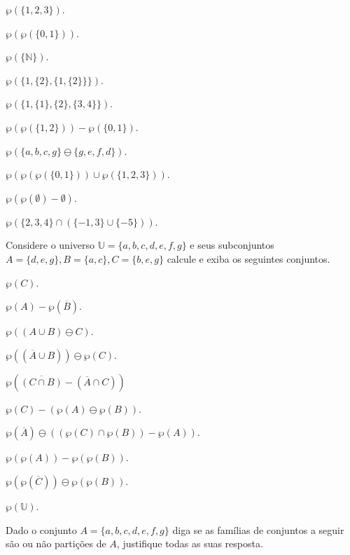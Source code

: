\begin{exerList}
	\item $\wp(\{1, 2, 3\})$.
	\item $\wp(\wp(\{0,1\}))$.
	\item $\wp(\{\mathbb{N}\})$.
	\item $\wp(\{1, \{2\}, \{1, \{2\}\}\})$.
	\item $\wp(\{1, \{1\}, \{2\}, \{3, 4\}\})$.
	\item $\wp(\wp(\{1, 2\})) - \wp(\{0, 1\})$.
	\item $\wp(\{a, b, c, g\} \ominus \{g, e, f, d\})$.
	\item $\wp(\wp(\wp(\{0,1\})) \cup \wp(\{1, 2, 3\}))$.
	\item $\wp(\wp(\emptyset) - \emptyset)$.
	\item $\wp(\{2, 3, 4\} \cap (\{-1, 3\} \cup \{-5\}))$.
\end{exerList}

\begin{questao}\label{test:Conjuntos15}
	Considere o universo $\mathbb{U} = \{a, b, c, d, e, f, g\}$ e seus subconjuntos $A = \{d, e, g\}, B = \{a, c\}, C =\{b, e, g\}$ calcule e exiba os seguintes conjuntos.
\end{questao}

\begin{exerList}
	\item $\wp(C)$.
	\item $\wp(A) - \wp(\overline{B})$.
	\item $\wp((A \cup B) \ominus C)$.
	\item $\wp((\overline{A} \cup B)) \ominus \wp(C)$.
	\item $\wp(\overline{(C \cap B)} - (\overline{A} \cap C))$
	\item $\wp(C) - (\wp(A) \ominus \wp(B))$.
	\item $\wp(\overline{A}) \ominus ((\wp(C) \cap \wp(B))  -  \wp(A))$.
	\item $\wp(\wp(A)) - \wp(\wp(B))$.
	\item $\wp(\wp(\overline{C})) \ominus \wp(\wp(B))$.
	\item $\wp(\mathbb{U})$.
\end{exerList}

\begin{questao}\label{test:Conjuntos16}
	Dado o conjunto $A = \{a, b, c, d, e, f, g\}$ diga se as famílias de conjuntos a seguir são ou não partições de $A$, justifique todas as suas resposta.
\end{questao}

